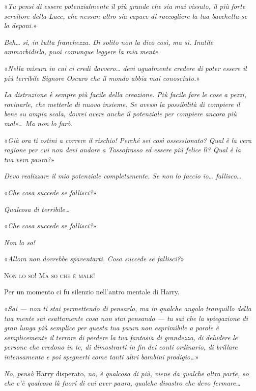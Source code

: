 «\textit{Tu pensi di essere potenzialmente il più grande che sia mai vissuto, il più forte servitore della Luce, che nessun altro sia capace di raccogliere la tua bacchetta se la deponi.}»

\textit{Beh… sì, in tutta franchezza. Di solito non la dico così, ma sì. Inutile ammorbidirla, puoi comunque leggere la mia mente.}

«\textit{Nella misura in cui ci credi davvero… devi ugualmente credere di poter essere il più terribile Signore Oscuro che il mondo abbia mai conosciuto.}»

\textit{La distruzione è sempre più facile della creazione. Più facile fare le cose a pezzi, rovinarle, che metterle di nuovo insieme. Se avessi la possibilità di compiere il bene su ampia scala, dovrei avere anche il potenziale per compiere ancora più male… Ma non lo farò.}

«\textit{Già ora ti ostini a correre il rischio! Perché sei così ossessionato? Qual è la vera ragione per cui non devi andare a Tassofrasso ed essere più felice lì? Qual è la tua vera paura?}»

\textit{Devo realizzare il mio potenziale completamente. Se non lo faccio io… fallisco…}

«\textit{Che cosa succede se fallisci?}»

\textit{Qualcosa di terribile…}

«\textit{Che cosa succede se fallisci?}»

\textit{Non lo so!}

«\textit{Allora non dovrebbe spaventarti. Cosa succede se fallisci?}»

\textsc{Non lo so! Ma so che è male!}

Per un momento ci fu silenzio nell’antro mentale di Harry.

«\textit{Sai — non ti stai permettendo di pensarlo, ma in qualche angolo tranquillo della tua mente sai esattamente cosa non stai pensando — tu sai che la spiegazione di gran lunga più semplice per questa tua paura non esprimibile a parole è semplicemente il terrore di perdere la tua fantasia di grandezza, di deludere le persone che credono in te, di dimostrarti in fin dei conti ordinario, di brillare intensamente e poi spegnerti come tanti altri bambini prodigio…}»

\textit{No, pensò} Harry disperato, \textit{no, è qualcosa di più, viene da qualche altra parte, so che c’è qualcosa là fuori di cui aver paura, qualche disastro che devo fermare…}

